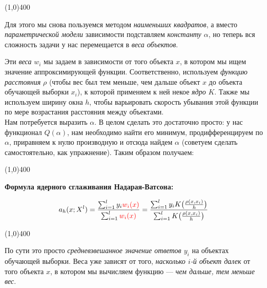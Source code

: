 \documentclass{article}
\begin{document}
\begin{center}
\line(1,0){400}
\end{center}

Для этого мы снова пользуемся методом \textit{наименьших квадратов}, а вместо \textit{параметрической модели} зависимости подставляем \textit{константу $\alpha$}, но теперь вся сложность задачи у нас перемещается в \textit{веса объектов}.

Эти \textit{веса} $w_i$ мы задаем в зависимости от того объекта $x$, в котором мы ищем значение аппроксимирующей функции. Соответственно, используем \textit{функцию расстояния} $\rho$ (чтобы вес был тем меньше, чем дальше объект $x$ до объекта обучающей выборки $x_i$), к которой применяем к ней некое \textit{ядро} $K$. Также мы используем ширину окна $h$, чтобы варьировать скорость убывания этой функции по мере возрастания расстояния между объектами.
\\

Нам потребуется выразить $\alpha$. В целом сделать это достаточно просто:  у нас функционал $Q(\alpha)$, нам необходимо найти его минимум, продифференцируем по $\alpha$, приравняем к нулю производную и отсюда найдем $\alpha$ (советуем сделать самостоятельно, как упражнение). Таким образом получаем:

\begin{center}
\line(1,0){400}
\end{center}

\textbf{Формула ядерного сглаживания Надарая-Ватсона:}

$$a_h(x; X^l) = \frac{\sum_{i = 1}^l y_i\textcolor{red}{w_i(x)}}
						{\sum_{i = 1}^l \textcolor{red}{w_i(x)}}
= \frac{\sum_{i = 1}^l y_i K\bigl(\frac{\rho(x, x_i)}{h}\bigr)}
		{\sum_{i = 1}^l K\bigl(\frac{\rho(x, x_i)}{h}\bigr)}$$
		
\begin{center}
\line(1,0){400}
\end{center}

По сути это просто \textit{средневзвешанное значение ответов $y_i$} на объектах обучающей выборки. Веса уже зависят от того, \textit{насколько $i$-й объект далек} от того объекта $x$, в котором мы вычисляем функцию --- \textit{чем дальше, тем меньше вес}.
\end{document}
